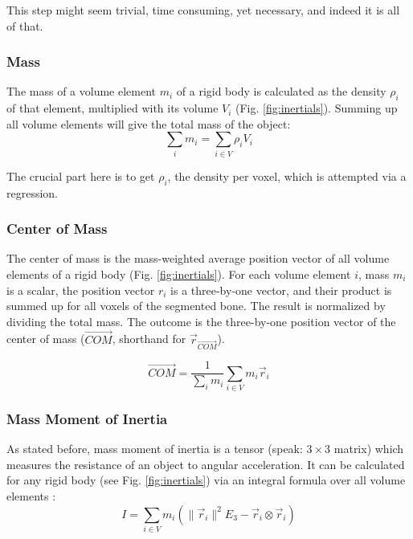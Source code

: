 This step might seem trivial, time consuming, yet necessary, and indeed it is all of that.
\subsubsection{Mass}
\label{sec:org1160963}
The mass of a volume element \(m_{i}\) of a rigid body is calculated as the density \(\rho_{i}\) of that element, multiplied with its volume \(V_{i}\) (Fig. \ref{fig:inertials}).
Summing up all volume elements will give the total mass of the object:
\begin{equation}\label{eqn:mass}
\sum_{i} m_{i} = \sum\limits_{i \in V} \rho_{i} V_{i}
\end{equation}

The crucial part here is to get \(\rho_{i}\), the density per voxel, which is attempted via a regression.
\subsubsection{Center of Mass}
\label{sec:orge1cbbab}
The center of mass is the mass-weighted average position vector of all volume elements of a rigid body (Fig. \ref{fig:inertials}).
For each volume element \(i\), mass \(m_{i}\) is a scalar, the position vector \(r_{i}\) is a three-by-one vector, and their product is summed up for all voxels of the segmented bone.
The result is normalized by dividing the total mass.
The outcome is the three-by-one position vector of the center of mass (\(\vec{COM}\), shorthand for \(\vec{r}_{\vec{COM}}\)).
\begin{change}
\begin{equation}\label{eqn:com}
 \vec{COM} = \frac{1}{\sum_i m_{i}} \sum\limits_{i \in V} m_{i} \vec{r}_{i}
\end{equation}
\end{change}
\subsubsection{Mass Moment of Inertia}
\label{sec:org5c9465d}
As stated before, mass moment of inertia is a tensor (speak: \(3\times 3\) matrix) which measures the resistance of an object to angular acceleration.
It can be calculated for any rigid body (see Fig. \ref{fig:inertials}) via an integral formula over all volume elements \citep{WikipediaMOI}:
\begin{equation}\label{eqn:mmoi}
 I = \sum\limits_{i \in V} m_{i} \left( \lVert \vec{r}_{i} \rVert^{2}E_3 - \vec{r}_{i} \otimes \vec{r}_{i} \right)
\end{equation}

